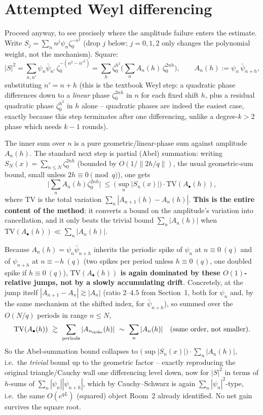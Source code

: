 \documentclass[11pt]{article}
\begin{document}
\section{Attempted Weyl differencing}
Proceed anyway, to see precisely where the amplitude failure enters the estimate. Write
$S_j=\sum_n n^j\psi_n\zeta_0^{-n^2}$ (drop $j$ below; $j=0,1,2$ only changes the polynomial weight,
not the mechanism). Square:
\[|S|^2=\sum_{n,n'}\psi_n\bar\psi_{n'}\,\zeta_0^{-(n^2-n'^2)}=\sum_h\zeta_0^{h^2}\Big(\sum_n
A_n(h)\,\zeta_0^{2nh}\Big),\qquad A_n(h):=\psi_n\,\bar\psi_{n+h},\]
substituting $n'=n+h$ (this is the textbook Weyl step: a quadratic phase differences down to a
\emph{linear} phase $\zeta_0^{2nh}$ in $n$ for each fixed shift $h$, plus a residual quadratic phase
$\zeta_0^{h^2}$ in $h$ alone -- quadratic phases are indeed the easiest case, exactly because this
step terminates after one differencing, unlike a degree-$k>2$ phase which needs $k-1$ rounds).

The inner sum over $n$ is a pure geometric/linear-phase sum against amplitude $A_n(h)$. The standard
next step is partial (Abel) summation: writing $S_N(x)=\sum_{n\le N}\zeta_0^{2nh}$ (bounded by
$O(1/\|2h/q\|)$, the usual geometric-sum bound, small unless $2h\equiv0\pmod q$), one gets
\[\Big|\sum_n A_n(h)\zeta_0^{2nh}\Big|\ \le\ \big(\sup_n|S_n(x)|\big)\cdot\mathrm{TV}(A_\bullet(h)),\]
where $\mathrm{TV}$ is the total variation $\sum_n|A_{n+1}(h)-A_n(h)|$. \textbf{This is the entire
content of the method}: it converts a bound on the amplitude's variation into cancellation, and it
only beats the trivial bound $\sum_n|A_n(h)|$ when $\mathrm{TV}(A_\bullet(h))\ll\sum_n|A_n(h)|$.

Because $A_n(h)=\psi_n\bar\psi_{n+h}$ inherits the periodic spike of $\psi_n$ at $n\equiv0\ (q)$ and
of $\psi_{n+h}$ at $n\equiv-h\ (q)$ (two spikes per period unless $h\equiv0\ (q)$, one doubled spike
if $h\equiv0\ (q)$), \textbf{$\mathrm{TV}(A_\bullet(h))$ is again dominated by these $O(1)$-relative
jumps, not by a slowly accumulating drift}. Concretely, at the jump itself
$|A_{n+1}-A_n|\gtrsim|A_n|$ (ratio $2$--$4.5$ from Section~1, both for $\psi_n$ and, by the same
mechanism at the shifted index, for $\bar\psi_{n+h}$), so summed over the $O(N/q)$ periods in range
$n\le N$,
\[\mathrm{TV}(A_\bullet(h))\ \gtrsim\ \sum_{\text{periods}}|A_{n_{\rm spike}}(h)|\ \sim\ \sum_n|A_n(h)|
\quad(\text{same order, not smaller}).\]
So the Abel-summation bound collapses to $\big(\sup|S_n(x)|\big)\cdot\sum_n|A_n(h)|$, i.e.\ the
\emph{trivial} bound up to the geometric factor -- exactly reproducing the original triangle/Cauchy
wall one differencing level down, now for $|S|^2$ in terms of $h$-sums of $\sum_n|\psi_n||\psi_{n+h}|$,
which by Cauchy--Schwarz is again $\sum_n|\psi_n|^2$-type, i.e.\ the same $O(e^{qL})$ (squared)
object Room~2 already identified. No net gain survives the square root.
\end{document}
